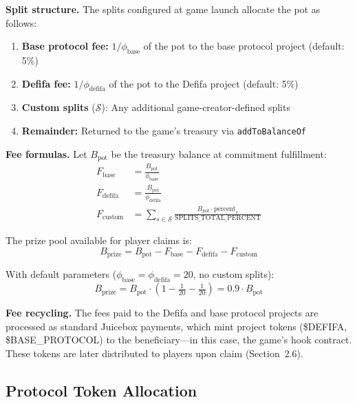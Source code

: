 \documentclass[11pt,a4paper]{article}
\begin{document}
\textbf{Split structure.} The splits configured at game launch allocate the pot as follows:
\begin{enumerate}[nosep]
    \item \textbf{Base protocol fee:} $1/\phi_{\text{base}}$ of the pot to the base protocol project (default: 5\%)
    \item \textbf{Defifa fee:} $1/\phi_{\text{defifa}}$ of the pot to the Defifa project (default: 5\%)
    \item \textbf{Custom splits} ($\mathcal{S}$): Any additional game-creator-defined splits
    \item \textbf{Remainder:} Returned to the game's treasury via \texttt{addToBalanceOf}
\end{enumerate}

\textbf{Fee formulas.} Let $B_{\text{pot}}$ be the treasury balance at commitment fulfillment:
\begin{align}
F_{\text{base}} &= \frac{B_{\text{pot}}}{\phi_{\text{base}}} \\[4pt]
F_{\text{defifa}} &= \frac{B_{\text{pot}}}{\phi_{\text{defifa}}} \\[4pt]
F_{\text{custom}} &= \sum_{s \in \mathcal{S}} \frac{B_{\text{pot}} \cdot \text{percent}_s}{\text{SPLITS\_TOTAL\_PERCENT}}
\end{align}

The prize pool available for player claims is:
\begin{equation}
\boxed{B_{\text{prize}} = B_{\text{pot}} - F_{\text{base}} - F_{\text{defifa}} - F_{\text{custom}}}
\end{equation}

With default parameters ($\phi_{\text{base}} = \phi_{\text{defifa}} = 20$, no custom splits):
\begin{equation}
B_{\text{prize}} = B_{\text{pot}} \cdot \left(1 - \tfrac{1}{20} - \tfrac{1}{20}\right) = 0.9 \cdot B_{\text{pot}}
\end{equation}

\textbf{Fee recycling.} The fees paid to the Defifa and base protocol projects are processed as standard Juicebox payments, which mint project tokens (\$DEFIFA, \$BASE\_PROTOCOL) to the beneficiary---in this case, the game's hook contract. These tokens are later distributed to players upon claim (Section~2.6).

\subsection{Protocol Token Allocation}
\end{document}

